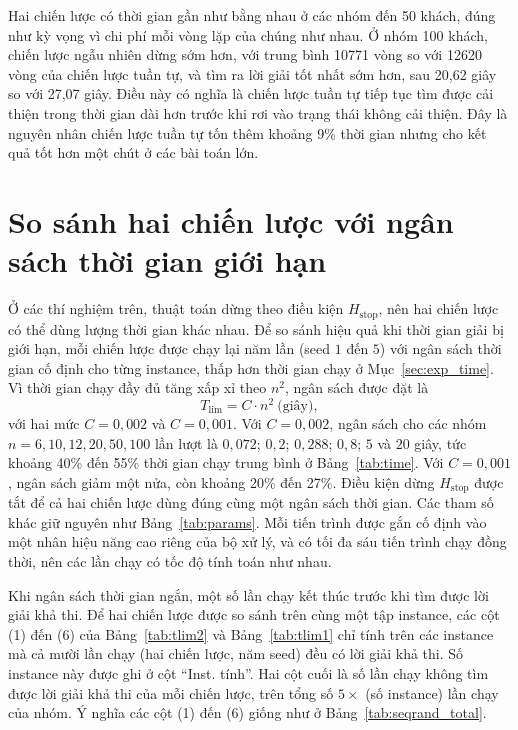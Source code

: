 \documentclass[../DoAn.tex]{subfiles}
\begin{document}
Hai chiến lược có thời gian gần như bằng nhau ở các nhóm đến 50 khách, đúng như kỳ vọng vì chi phí mỗi vòng lặp của chúng như nhau. Ở nhóm 100 khách, chiến lược ngẫu nhiên dừng sớm hơn, với trung bình 10771 vòng so với 12620 vòng của chiến lược tuần tự, và tìm ra lời giải tốt nhất sớm hơn, sau 20,62 giây so với 27,07 giây. Điều này có nghĩa là chiến lược tuần tự tiếp tục tìm được cải thiện trong thời gian dài hơn trước khi rơi vào trạng thái không cải thiện. Đây là nguyên nhân chiến lược tuần tự tốn thêm khoảng 9\% thời gian nhưng cho kết quả tốt hơn một chút ở các bài toán lớn.

\section{So sánh hai chiến lược với ngân sách thời gian giới hạn}
\label{sec:exp_tlim}

Ở các thí nghiệm trên, thuật toán dừng theo điều kiện $H_{\text{stop}}$, nên hai chiến lược có thể dùng lượng thời gian khác nhau. Để so sánh hiệu quả khi thời gian giải bị giới hạn, mỗi chiến lược được chạy lại năm lần (seed $1$ đến $5$) với ngân sách thời gian cố định cho từng instance, thấp hơn thời gian chạy ở Mục~\ref{sec:exp_time}. Vì thời gian chạy đầy đủ tăng xấp xỉ theo $n^2$, ngân sách được đặt là
\begin{equation}
T_{\text{lim}} = C \cdot n^2 \ \text{(giây)},
\label{eq:tlim}
\end{equation}
với hai mức $C = 0{,}002$ và $C = 0{,}001$. Với $C = 0{,}002$, ngân sách cho các nhóm $n = 6, 10, 12, 20, 50, 100$ lần lượt là $0{,}072$; $0{,}2$; $0{,}288$; $0{,}8$; $5$ và $20$ giây, tức khoảng 40\% đến 55\% thời gian chạy trung bình ở Bảng~\ref{tab:time}. Với $C = 0{,}001$, ngân sách giảm một nửa, còn khoảng 20\% đến 27\%. Điều kiện dừng $H_{\text{stop}}$ được tắt để cả hai chiến lược dùng đúng cùng một ngân sách thời gian. Các tham số khác giữ nguyên như Bảng~\ref{tab:params}. Mỗi tiến trình được gắn cố định vào một nhân hiệu năng cao riêng của bộ xử lý, và có tối đa sáu tiến trình chạy đồng thời, nên các lần chạy có tốc độ tính toán như nhau.

Khi ngân sách thời gian ngắn, một số lần chạy kết thúc trước khi tìm được lời giải khả thi. Để hai chiến lược được so sánh trên cùng một tập instance, các cột (1) đến (6) của Bảng~\ref{tab:tlim2} và Bảng~\ref{tab:tlim1} chỉ tính trên các instance mà cả mười lần chạy (hai chiến lược, năm seed) đều có lời giải khả thi. Số instance này được ghi ở cột ``Inst. tính''. Hai cột cuối là số lần chạy không tìm được lời giải khả thi của mỗi chiến lược, trên tổng số $5 \times$ (số instance) lần chạy của nhóm. Ý nghĩa các cột (1) đến (6) giống như ở Bảng~\ref{tab:seqrand_total}.
\end{document}
